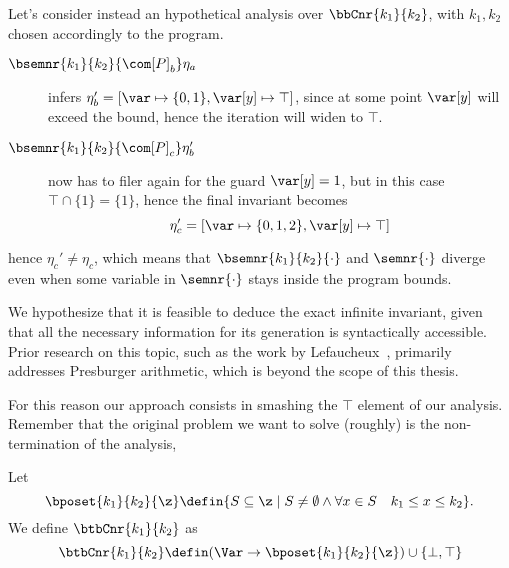 Let's consider instead an hypothetical analysis over
\(\bbCnr{k_1}{k_2}\), with \(k_1,k_2\) chosen accordingly to the
program.
\begin{description}
\item[\(\bsemnr{k_1}{k_2}{{\com[P]}_b}\eta_a\)] infers
  \(\eta_b' = [\var\mapsto\{0,1\}, \var[y]\mapsto\top]\), since at
  some point \(\var[y]\) will exceed the bound, hence the iteration
  will widen to \(\top\).
  
\item[\(\bsemnr{k_1}{k_2}{{\com[P]}_c}\eta_b'\)] now has to filer
  again for the guard \(\var[y] = 1\), but in this case
  \(\top \cap \{1\} = \{1\}\), hence the final invariant becomes
  \begin{equation*}
    \eta_c' = [\var\mapsto\{0,1,2\}, \var[y] \mapsto \top]
  \end{equation*}
\end{description}
hence \(\eta_c'\neq\eta_c\), which means that
\(\bsemnr{k_1}{k_2}{\cdot}\) and \(\semnr{\cdot}\) diverge even when
some variable in \(\semnr{\cdot}\) stays inside the program bounds.

We hypothesize that it is feasible to deduce the exact infinite
invariant, given that all the necessary information for its generation
is syntactically accessible. Prior research on this topic, such as the
work by Lefaucheux~\cite{Lefaucheux2024}, primarily addresses
Presburger arithmetic, which is beyond the scope of this thesis.

For this reason our approach consists in smashing the \(\top\) element
of our analysis. Remember that the original problem we want to solve
(roughly) is the non-termination of the analysis,


\begin{definition}
  Let
  \begin{equation*}
    \bposet{k_1}{k_2}{\z} \defin \{S \subseteq \z \mid S \neq \emptyset \land \forall x \in S \quad k_1 \leq x \leq k_2\}.
  \end{equation*}
  We define \(\btbCnr{k_1}{k_2}\) as
  \begin{equation*}
    \btbCnr{k_1}{k_2} \defin (\Var \to \bposet{k_1}{k_2}{\z}) \cup \{\bot, \top\}
  \end{equation*}
\end{definition}

